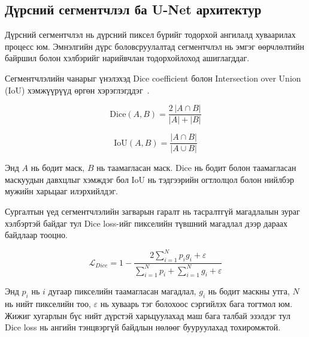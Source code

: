 \subsection*{Дүрсний сегментчлэл ба U-Net архитектур}

\begin{figure}[H]
    \centering
    \label{fig:unet}
\end{figure}

Дүрсний сегментчлэл нь дүрсний пиксел бүрийг тодорхой ангилалд хуваарилах процесс юм. Эмнэлгийн дүрс боловсруулалтад сегментчлэл нь эмгэг өөрчлөлтийн байршил болон хэлбэрийг нарийвчлан тодорхойлоход ашиглагддаг.

Сегментчлэлийн чанарыг үнэлэхэд Dice coefficient болон Intersection over Union (IoU) хэмжүүрүүд өргөн хэрэглэгддэг~\cite{ref13}.

\begin{equation}
    \mathrm{Dice}(A, B) = \frac{2\,|A \cap B|}{|A| + |B|}
    \label{eq:dice}
\end{equation}

\begin{equation}
    \mathrm{IoU}(A, B) = \frac{|A \cap B|}{|A \cup B|}
    \label{eq:iou}
\end{equation}

Энд $A$ нь бодит маск, $B$ нь таамагласан маск. Dice нь бодит болон таамагласан маскуудын давхцлыг хэмждэг бол IoU нь тэдгээрийн огтлолцол болон нийлбэр мужийн харьцааг илэрхийлдэг.

Сургалтын үед сегментчлэлийн загварын гаралт нь тасралтгүй магадлалын зураг хэлбэртэй байдаг тул Dice loss-ийг пикселийн түвшний магадлал дээр дараах байдлаар тооцно.

\begin{equation}
    \mathcal{L}_{Dice} =
    1 - \frac{2\sum_{i=1}^{N} p_i g_i + \varepsilon}
    {\sum_{i=1}^{N} p_i + \sum_{i=1}^{N} g_i + \varepsilon}
    \label{eq:dice_loss}
\end{equation}

Энд $p_i$ нь $i$ дугаар пикселийн таамагласан магадлал, $g_i$ нь бодит маскны утга, $N$ нь нийт пикселийн тоо, $\varepsilon$ нь хуваарь тэг болохоос сэргийлэх бага тогтмол юм. Жижиг хугарлын бүс нийт дүрстэй харьцуулахад маш бага талбай эзэлдэг тул Dice loss нь ангийн тэнцвэргүй байдлын нөлөөг бууруулахад тохиромжтой.

